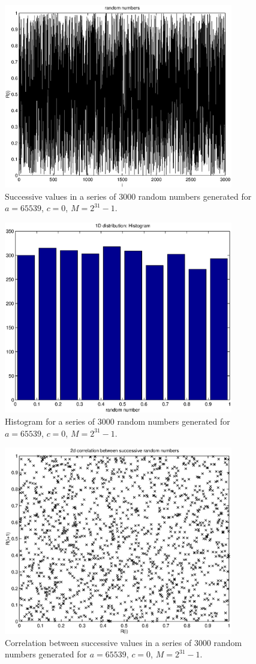 \begin{figure}
\label{F_TRANDOM2_1}
\includegraphics[width=10cm]{./Figures/f_trandom2_1.eps}
\caption{Successive values in a series of 3000 random numbers generated
for $a=65539$, $c=0$, $M=2^{31}-1$.}
\end{figure}

\begin{figure}
\label{F_TRANDOM2_2}
\includegraphics[width=10cm]{./Figures/f_trandom2_2.eps}
\caption{Histogram for a series of 3000 random numbers generated
for $a=65539$, $c=0$, $M=2^{31}-1$.}
\end{figure}

\begin{figure}
\label{F_TRANDOM2_3}
\includegraphics[width=10cm]{./Figures/f_trandom2_3.eps}
\caption{Correlation between successive values in a series of 3000 
random numbers generated for $a=65539$, $c=0$, $M=2^{31}-1$.}
\end{figure}


